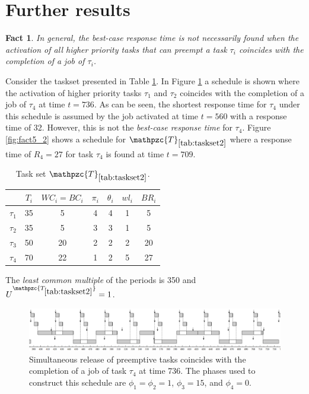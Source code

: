 \documentclass[fleqn]{article}
\newtheorem{fact}{Fact}
\begin{document}
\section{Further results}

\begin{fact}
	In general, the \textit{best-case response time} is not necessarily found when the activation of all higher priority tasks that can preempt a task $\tau_i$ coincides with the completion of a job of $\tau_i$.
\end{fact}

Consider the taskset presented in Table \ref{tab:taskset2}. In Figure \ref{fig:fact5_1} a schedule is shown where the activation of higher priority tasks $\tau_1$ and $\tau_2$ coincides with the completion of a job of $\tau_4$ at time $t=736$. As can be seen, the shortest response time for $\tau_4$ under this schedule is assumed by the job activated at time $t=560$ with a response time of 32. However, this is not the \textit{best-case response time} for $\tau_4$. Figure \ref{fig:fact5_2} shows a schedule for $\mathpzc{T}_{\ref{tab:taskset2}}$ where a response time of $R_4=27$ for task $\tau_4$ is found at time $t=709$. 
\begin{table}[H]
	\center
	\caption{Task set $\mathpzc{T}_{\ref{tab:taskset2}}$.}
	\label{tab:taskset2}
	\begin{tabular}{c c c c c | c c}
		\hline 
		& $T_i$ & $WC_i=BC_i$ & $\pi_i$ & $\theta_i$ &  $wl_i$ & $BR_i$\\ 
		\hline 
		$\tau_1$& 35 & 5  & 4 & 4 &  1 & 5\\ 
		$\tau_2$& 35 & 5  & 3 & 3 &  1 & 5\\ 
		$\tau_3$& 50 & 20 & 2 & 2 &  2 & 20\\ 
		$\tau_4$& 70 & 22 & 1 & 2 &  5 & 27\\
		\hline 
	\end{tabular}
	\small
	\item The \textit{least common multiple} of the periods is 350 and $U^{\mathpzc{T_{\ref{tab:taskset2}}}}=1$.
\end{table} 

\begin{figure}[H]
	\centering
	\includegraphics[width=1.1\linewidth]{figures/fact5_1}
	\caption{Simultaneous release of preemptive tasks coincides with the completion of a job of task $\tau_4$ at time 736. The phases used to construct this schedule are $\phi_1 = \phi_2 = 1$, $\phi_3 = 15$, and $\phi_4 = 0$.}
	\label{fig:fact5_1}
\end{figure}
\end{document}
